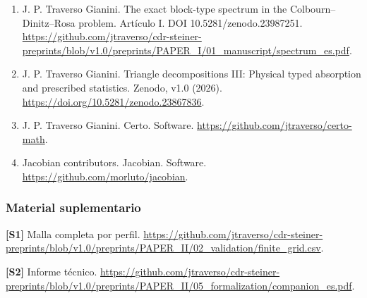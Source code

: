 \documentclass[spanish,11pt,a4paper]{article}
\begin{document}
\begin{enumerate}
\item
  J. P. Traverso Gianini. The exact block-type spectrum in the Colbourn--Dinitz--Rosa problem. Artículo I. DOI 10.5281/zenodo.23987251. \url{https://github.com/jtraverso/cdr-steiner-preprints/blob/v1.0/preprints/PAPER_I/01_manuscript/spectrum_es.pdf}.
\item
  J. P. Traverso Gianini. Triangle decompositions III: Physical typed absorption and prescribed statistics. Zenodo, v1.0 (2026). \url{https://doi.org/10.5281/zenodo.23867836}.
\item
  J. P. Traverso Gianini. Certo. Software. \url{https://github.com/jtraverso/certo-math}.
\item
  Jacobian contributors. Jacobian. Software. \url{https://github.com/morluto/jacobian}.
\end{enumerate}

\subsubsection{Material suplementario}\label{material-suplementario}

\textbf{{[}S1{]}} Malla completa por perfil. \url{https://github.com/jtraverso/cdr-steiner-preprints/blob/v1.0/preprints/PAPER_II/02_validation/finite_grid.csv}.

\textbf{{[}S2{]}} Informe técnico. \url{https://github.com/jtraverso/cdr-steiner-preprints/blob/v1.0/preprints/PAPER_II/05_formalization/companion_es.pdf}.
\end{document}
